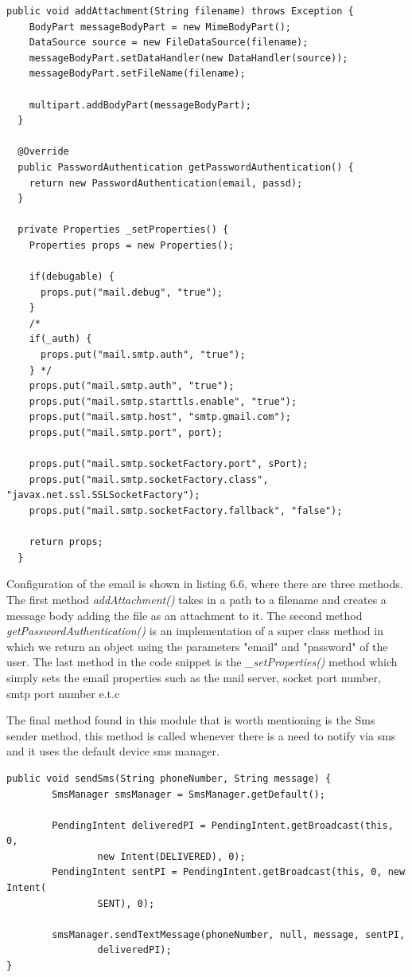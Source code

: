\begin{lstlisting}[label=Mail-send,caption=Mail configuration] 
public void addAttachment(String filename) throws Exception { 
    BodyPart messageBodyPart = new MimeBodyPart(); 
    DataSource source = new FileDataSource(filename); 
    messageBodyPart.setDataHandler(new DataHandler(source)); 
    messageBodyPart.setFileName(filename); 

    multipart.addBodyPart(messageBodyPart); 
  } 
 
  @Override 
  public PasswordAuthentication getPasswordAuthentication() { 
    return new PasswordAuthentication(email, passd); 
  } 

  private Properties _setProperties() { 
    Properties props = new Properties(); 
    
    if(debugable) { 
      props.put("mail.debug", "true"); 
    } 
    /*
    if(_auth) { 
      props.put("mail.smtp.auth", "true"); 
    } */
    props.put("mail.smtp.auth", "true");
	props.put("mail.smtp.starttls.enable", "true");
	props.put("mail.smtp.host", "smtp.gmail.com");
	props.put("mail.smtp.port", port);
	
    props.put("mail.smtp.socketFactory.port", sPort); 
    props.put("mail.smtp.socketFactory.class", "javax.net.ssl.SSLSocketFactory"); 
    props.put("mail.smtp.socketFactory.fallback", "false");

    return props; 
  } 
\end{lstlisting}

Configuration of the email is shown in listing 6.6, where there are three methods. The first method {\it addAttachment()} takes in a path to a filename and creates a message body adding the file as an attachment to it. The second method {\it getPasswordAuthentication()} is an implementation of a super class method in which we return an object using the parameters "email" and "password" of the user. The last method in the code snippet is the {\it \_setProperties()} method which simply sets the email properties such as the mail server, socket port number, smtp port number e.t.c

The final method found in this module that is worth mentioning is the Sms sender method, this method is called whenever there is a need to notify via sms and it uses the default device sms manager. 

\begin{lstlisting}[label=smsl-send,caption=Sms sender method] 
public void sendSms(String phoneNumber, String message) {
		SmsManager smsManager = SmsManager.getDefault();

		PendingIntent deliveredPI = PendingIntent.getBroadcast(this, 0,
				new Intent(DELIVERED), 0);
		PendingIntent sentPI = PendingIntent.getBroadcast(this, 0, new Intent(
				SENT), 0);

		smsManager.sendTextMessage(phoneNumber, null, message, sentPI,
				deliveredPI);
}
\end{lstlisting}

